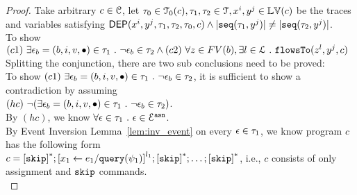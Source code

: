 \begin{proof}
Take arbitrary $c \in \mathcal{C}$,
%
let $\mathtt{\tau}_0 \in \mathcal{T}_0(c), \mathtt{\tau}_1, \mathtt{\tau}_2 \in \mathcal{T}, x^i, y^j \in \mathbb{LV}(c)$ be the traces and variables satisfying 
$\mathsf{DEP}(x^i, y^j, \mathtt{\tau}_1, \mathtt{\tau}_2 , \mathtt{\tau}_0, c) \land
|\mathtt{seq}(\mathtt{\tau}_1, y^j)| \neq |\mathtt{seq}(\mathtt{\tau}_2, y^j)|$.
\\
To show 
$(c1)~\exists \mathtt{\epsilon}_b = (b, i, v, \bullet) \in \mathtt{\tau}_1 ~.~ \neg \mathtt{\epsilon}_b \in \mathtt{\tau}_2
\land 
(c2)~\forall z \in FV(b), \exists l \in \mathcal{L} ~.~ \mathtt{flowsTo}(z^l, y^j, c)$
\\
Splitting the conjunction, there are two sub conclusions need to be proved:
\\
To show 
$(c1)~\exists \mathtt{\epsilon}_b = (b, i, v, \bullet) \in \mathtt{\tau}_1 ~.~ \neg \mathtt{\epsilon}_b \in \mathtt{\tau}_2$, 
it is sufficient to show a contradiction by assuming 
\\
$(hc)~\neg (\exists \mathtt{\epsilon}_b = (b, i, v, \bullet) \in \mathtt{\tau}_1 ~.~ \neg \mathtt{\epsilon}_b \in \mathtt{\tau}_2)$.
\\
By $(hc)$, we know $\forall \mathtt{\epsilon} \in \mathtt{\tau}_1 ~.~ \mathtt{\epsilon} \in \mathcal{E}^{\mathtt{{asn}}}$.
\\
By Event Inversion Lemma~\ref{lem:inv_event} on every $\mathtt{\epsilon} \in \mathtt{\tau}_1$, we know program $c$ has the following form
\\
$c =  \clabel{\eskip}^*;\clabel{\assign{x_1}{\expr_1 / \query(\qexpr_1)}}^{l_1}; \clabel{\eskip}^*; \ldots; \clabel{\eskip}^* $, i.e., $c$ consists of 
only assignment and $\mathtt{skip}$ commands.
\\

\end{proof}
